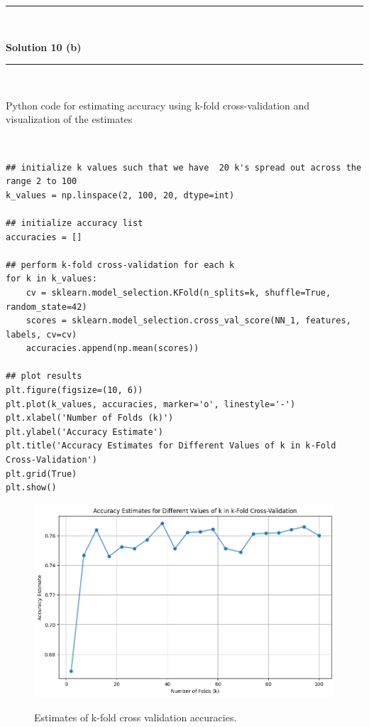 \documentclass{article}
\begin{document}
\noindent\rule{\textwidth}{0.4pt}\\

\newpage

\textbf{Solution 10 (b)}

\noindent\rule{\textwidth}{0.4pt}\\

\parbox{\textwidth}{Python code for estimating accuracy using k-fold cross-validation and visualization of the estimates}\\

\begin{center}
\begin{lstlisting}
## initialize k values such that we have  20 k's spread out across the range 2 to 100
k_values = np.linspace(2, 100, 20, dtype=int)
  
## initialize accuracy list
accuracies = []
  
## perform k-fold cross-validation for each k
for k in k_values:
    cv = sklearn.model_selection.KFold(n_splits=k, shuffle=True, random_state=42)
    scores = sklearn.model_selection.cross_val_score(NN_1, features, labels, cv=cv)
    accuracies.append(np.mean(scores))
  
## plot results
plt.figure(figsize=(10, 6))
plt.plot(k_values, accuracies, marker='o', linestyle='-')
plt.xlabel('Number of Folds (k)')
plt.ylabel('Accuracy Estimate')
plt.title('Accuracy Estimates for Different Values of k in k-Fold Cross-Validation')
plt.grid(True)
plt.show()
\end{lstlisting}
\end{center}

\begin{figure}[htbp]
\includegraphics[width=1\textwidth]{q10_b.png} \\
\caption{Estimates of k-fold cross validation accuracies.}
\label{fig:image_comparison}
\end{figure} 
\end{document}

